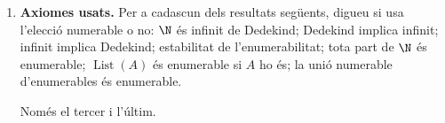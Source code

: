 \begin{enumerate}[resume]
  \item \textbf{Axiomes usats.} Per a cadascun dels resultats següents, digueu si usa l'elecció numerable o no: \(\N\) és infinit de Dedekind; Dedekind implica infinit; infinit implica Dedekind; estabilitat de l'enumerabilitat; tota part de \(\N\) és enumerable; \(\operatorname{List}(A)\) és enumerable si \(A\) ho és; la unió numerable d'enumerables és enumerable. \begin{indicacio}Només el tercer i l'últim.\end{indicacio}
\end{enumerate}

